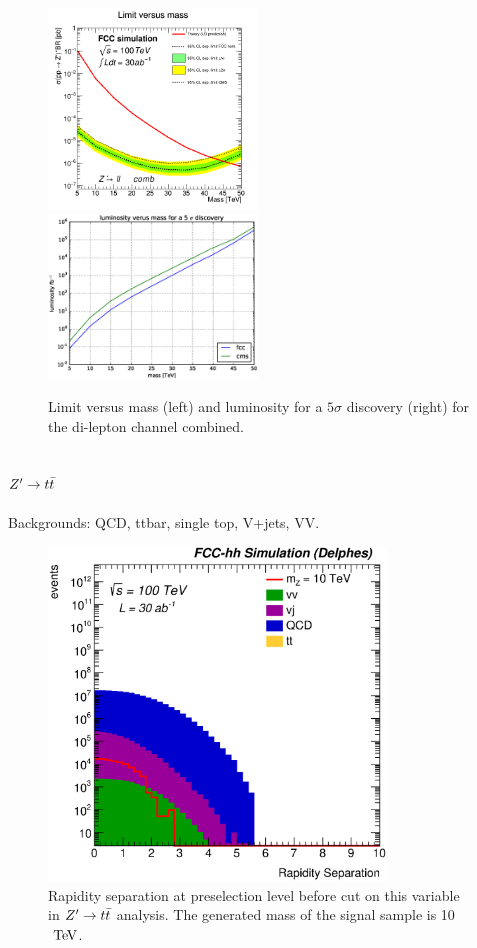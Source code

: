 \documentclass{cernrep}
\begin{document}
\begin{figure}[!htb]\centering
\includegraphics[width=0.495\textwidth]{Fig/lim_Zprime_ll_fcc_cms.png}
\includegraphics[width=0.495\textwidth]{Fig/DiscoveryPotential_ll.eps}
\caption{Limit versus mass (left) and luminosity for a $5\sigma$ discovery (right) for the
 di-lepton channel combined.}
\label{fig:zpll_lim}
\end{figure}

\subsection{$Z^{\prime} \rightarrow t\bar{t}$}
\label{subsec:Zptt}

Backgrounds: QCD, ttbar, single top, V+jets, VV. 

\begin{figure}[!htb]\centering
\includegraphics[width=0.8\textwidth]{Fig/Zptt/rapiditySeparation_sel0_before_cut_nostack_log.eps}
\caption{Rapidity separation at preselection level before cut on this variable in $Z^{\prime} \rightarrow t\bar{t}$ analysis. The generated mass of the signal sample is 10 $\TeV$.}
\label{fig:Zptt_sel0_rapidity}
\end{figure}
\end{document}
